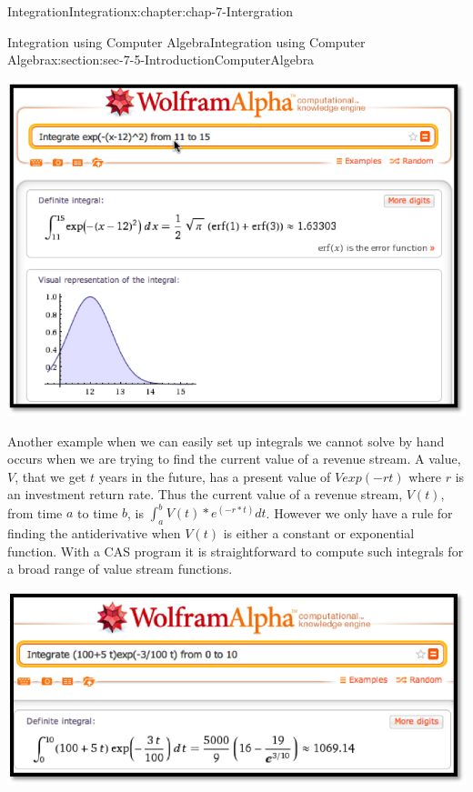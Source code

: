 \documentclass[oneside,10pt,]{book}
\numberwithin{equation}{section}
\begin{document}
\begin{chapterptx}{Integration}{}{Integration}{}{}{x:chapter:chap-7-Intergration}
\begin{sectionptx}{Integration using Computer Algebra}{}{Integration using Computer Algebra}{}{}{x:section:sec-7-5-IntroductionComputerAlgebra}
\begin{sidebyside}{1}{0.05}{0.05}{0}
\begin{sbspanel}{0.9}
\includegraphics[width=\linewidth]{images/sec7-5-12.png}
\end{sbspanel}%
\end{sidebyside}%
\par
Another example when we can easily set up integrals we cannot solve by hand occurs when we are trying to find the current value of a revenue stream.  A value, \(V\), that we get \(t\) years in the future, has a present value of \(V exp(-r t)\) where \(r\) is an investment return rate.  Thus the current value of a revenue stream, \(V(t)\), from time \(a\) to time \(b\), is \(\int_a^b V(t)*e^{(-r*t)} dt\).  However we only have a rule for finding the antiderivative when \(V(t)\) is either a constant or exponential function.  With a CAS program it is straightforward to compute such integrals for a broad range of value stream functions.%
\begin{sidebyside}{1}{0.1}{0.1}{0}%
\begin{sbspanel}{0.8}%
\includegraphics[width=\linewidth]{images/sec7-5-13.png}
\end{sbspanel}%
\end{sidebyside}%

\end{sectionptx}
\end{chapterptx}
\end{document}
